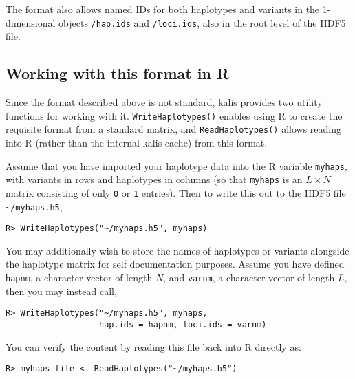 \documentclass[a4paper]{article}
\let\proglang=\textsf
\newcommand{\pkg}[1]{{\fontseries{m}\fontseries{b}\selectfont #1}}
\begin{document}
The format also allows named IDs for both haplotypes and variants in the 1-dimensional objects \texttt{/hap.ids} and \texttt{/loci.ids}, also in the root level of the HDF5 file.



\subsection[Working with this format in R]{Working with this format in \proglang{R}}
\label{apx:writehdf5}

Since the format described above is not standard, \pkg{kalis} provides two utility functions for working with it.
\texttt{WriteHaplotypes()} enables using \proglang{R} to create the requisite format from a standard matrix, and \texttt{ReadHaplotypes()} allows reading into \proglang{R} (rather than the internal \pkg{kalis} cache) from this format.

Assume that you have imported your haplotype data into the \proglang{R} variable \texttt{myhaps}, with variants in rows and haplotypes in columns (so that \texttt{myhaps} is an \(L \times N\) matrix consisting of only \texttt{0} or \texttt{1} entries).
Then to write this out to the HDF5 file \texttt{\textasciitilde{}/myhaps.h5},

\begin{verbatim}
R> WriteHaplotypes("~/myhaps.h5", myhaps)
\end{verbatim}

You may additionally wish to store the names of haplotypes or variants alongside the haplotype matrix for self documentation purposes.
Assume you have defined \texttt{hapnm}, a character vector of length \(N\), and \texttt{varnm}, a character vector of length \(L\), then you may instead call,

\begin{verbatim}
R> WriteHaplotypes("~/myhaps.h5", myhaps,
                   hap.ids = hapnm, loci.ids = varnm)
\end{verbatim}

You can verify the content by reading this file back into R directly as:

\begin{verbatim}
R> myhaps_file <- ReadHaplotypes("~/myhaps.h5")
\end{verbatim}
\end{document}
